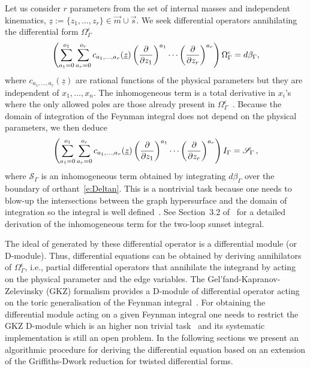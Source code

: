 \documentclass[a4paper,12pt]{article}
\numberwithin{equation}{section}
\numberwithin{figure}{section}
\begin{document}
Let us consider $r$ parameters from the set of internal masses and independent kinematics, $\underline z:=\{z_1,\dots,z_r\} \in \vec m \cup \vec s $. 
%
 We seek 
 differential operators 
annihilating the differential form $\Omega_\Gamma^\epsilon$ 
\begin{equation}\label{e:PFOmegaGeneric}
\left(  \sum_{a_1=0}^{o_1} \sum_{ a_r=0}^{o_r}  c_{a_1,\dots, a_r}(\underline z) \left(\partial\over \partial z_1\right)^{a_1}\cdots\left(\partial
  \over\partial z_r\right)^{a_r}  \right)\Omega_\Gamma^\epsilon=d\beta_\Gamma,
\end{equation}
where $  c_{a_1,\dots, a_r}(\underline z)$ are rational functions of the physical
parameters but they are independent of $x_1,\dots,x_n$. The inhomogeneous term is a total derivative in $x_i$'s where the only allowed poles are those already present in $\Omega_\Gamma^\epsilon$~\cite{Lairez:2022zkj}.
%
Because the domain of integration of the Feynman integral does not
depend on the physical parameters, we then deduce
\begin{equation}\label{e:PDEintFeynman}
  \left( \sum_{a_1=0}^{o_1} \sum_{ a_r=0}^{o_r}  c_{a_1,\dots, a_r}(\underline z) \left(\partial\over \partial z_1\right)^{a_1}\cdots\left(\partial
  \over\partial z_r\right)^{a_r}  \right)I_\Gamma=\mathscr{S}_\Gamma \, ,
\end{equation}
where $\mathscr{S}_\Gamma$ is an inhomogeneous term obtained by
integrating $d\beta_\Gamma$ over the boundary of
orthant~\eqref{e:Deltan}.
This is a nontrivial task because one needs
to blow-up the intersections between the graph hypersurface and the
domain of integration so the integral is well defined~\cite{bek,Brown:2009ta,Bloch:2016izu,muller2014picard}. See
Section~3.2 of~\cite{Bloch:2016izu} for a detailed derivation of the inhomogeneous term for
the two-loop sunset integral.

The ideal of generated by these
differential operator is a differential module (or D-module).  Thus,
differential equations can be obtained by deriving  annihilators  of
$\Omega_\Gamma^\epsilon$, i.e., partial differential operators that
annihilate  the integrand by acting on the physical parameter and the
edge variables.   The Gel'fand-Kapranov-Zelevinsky (GKZ) formalism provides
a D-module of differential operator acting on the toric generalisation
of the Feynman
integral~\cite{Vanhove:2018mto,delaCruz:2019skx,Klausen:2019hrg,Feng:2019bdx,Klemm:2019dbm,Ananthanarayan:2022ntm,Agostini:2022cgv,
  Munch:2022ouq}.  For obtaining the differential module acting on a
given Feynman integral one needs to restrict the GKZ  D-module which
is an higher non trivial task~\cite{delaCruz:2019skx,Chestnov:2023kww} and its systematic implementation is
still an open problem. In the following sections we present an
algorithmic procedure for deriving the differential equation based on
an extension of the Griffiths-Dwork reduction for twisted differential forms.
\end{document}
